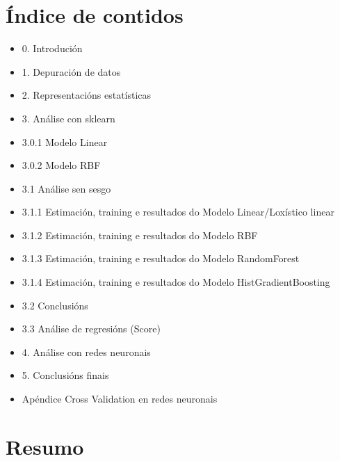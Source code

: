 \documentclass[12pt,a4paper,twoside]{article}
\begin{document}
\section*{Índice de contidos}
\begin{itemize}
	\item[] 0. Introdución
	\item[] 1. Depuración de datos
	\item[] 2. Representacións estatísticas
	\item[] 3. Análise con sklearn
	\item[] \hspace{4em}3.0.1 Modelo Linear
	\item[] \hspace{4em}3.0.2 Modelo RBF
	\item[] \hspace{2em}3.1 Análise sen sesgo
	\item[] \hspace{4em}3.1.1 Estimación, training e resultados do Modelo Linear/Loxístico linear
	\item[] \hspace{4em}3.1.2 Estimación, training e resultados do Modelo RBF
	\item[] \hspace{4em}3.1.3 Estimación, training e resultados do Modelo RandomForest
	\item[] \hspace{4em}3.1.4 Estimación, training e resultados do Modelo HistGradientBoosting
	\item[] \hspace{2em}3.2 Conclusións
	\item[] \hspace{2em}3.3 Análise de regresións (Score)
	\item[] 4. Análise con redes neuronais
	\item[] 5. Conclusións finais
	\item[] Apéndice Cross Validation en redes neuronais
\end{itemize}

\section*{Resumo}
\end{document}
